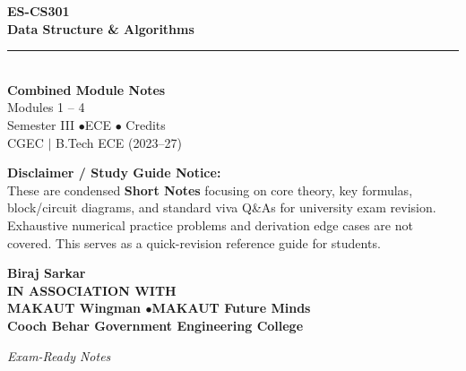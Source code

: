 \documentclass[12pt,a4paper]{article}
\begin{document}
\thispagestyle{empty}


\vspace*{1.0cm}
\begin{center}
  {\Huge\bfseries\color{myred} ES-CS301}\\[10pt]
  {\LARGE\bfseries\color{mydark} Data Structure \& Algorithms}\\[20pt]
  {\color{myred}\rule{0.7\linewidth}{1.5pt}}\\[18pt]
  {\Large\color{myteal}\textbf{Combined Module Notes}}\\[8pt]
  {\large\color{mydark} Modules 1 -- 4}\\[40pt]
  {\normalsize\color{mydark} Semester III \quad$\bullet$\quad ECE \quad$\bullet$ Credits}\\[12pt]
  {\normalsize\color{mydark} CGEC \;$|$\; B.Tech ECE (2023--27)}
\end{center}
\vspace{1.0cm}
\begin{center}
  \begin{tcolorbox}[colback=mygray, colframe=mgframe, boxrule=0.5pt, arc=3pt, width=0.85\linewidth]
    \centering\small\color{mydark}
    \textbf{Disclaimer / Study Guide Notice:}\\
    These are condensed \textbf{Short Notes} focusing on core theory, key formulas, block/circuit diagrams, and standard viva Q\&As for university exam revision. Exhaustive numerical practice problems and derivation edge cases are not covered. This serves as a quick-revision reference guide for students.
  \end{tcolorbox}
\end{center}
\vfill
\vspace{0.6cm}
\begin{center}
  {\large\bfseries\color{mypurple} Biraj Sarkar}\\[16pt]
  {\footnotesize\color{watermark}\textbf{IN ASSOCIATION WITH}}\\[8pt]
  {\small\bfseries\color{mydark} MAKAUT Wingman \quad$\bullet$\quad MAKAUT Future Minds}\\[12pt]
  {\large\bfseries\color{myteal} Cooch Behar Government Engineering College}
\end{center}
\vfill
\begin{center}{\small\color{watermark}\textit{Exam-Ready Notes}}\end{center}
\clearpage
\end{document}

